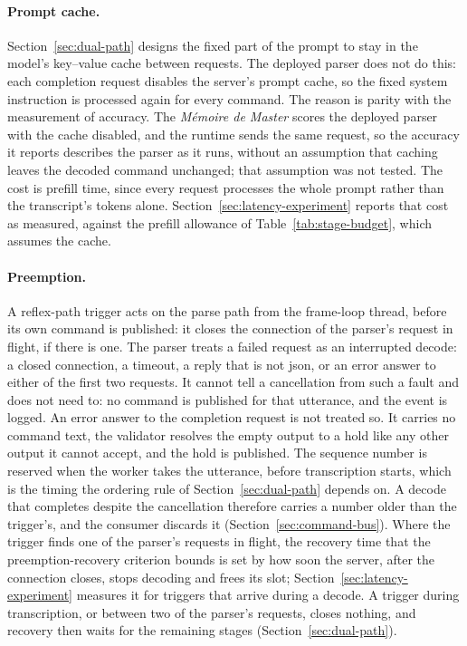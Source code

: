 \paragraph{Prompt cache.} Section~\ref{sec:dual-path} designs the fixed part of the prompt to stay
in the model's key--value cache between requests. The deployed parser does not do this: each
completion request disables the server's prompt cache, so the fixed system instruction is
processed again for every command. The reason is parity with the measurement of accuracy. The
\emph{M\'emoire de Master} scores the deployed parser with the cache disabled, and the runtime
sends the same request, so the accuracy it reports describes the parser as it runs, without an
assumption that caching leaves the decoded command unchanged; that assumption was not tested. The
cost is prefill time, since every request processes the whole prompt rather than the transcript's
tokens alone. Section~\ref{sec:latency-experiment} reports that cost as measured, against the
prefill allowance of Table~\ref{tab:stage-budget}, which assumes the cache.

\paragraph{Preemption.} A reflex-path trigger acts on the parse path from the frame-loop thread,
before its own command is published: it closes the connection of the parser's request in flight,
if there is one. The parser treats a failed request as an interrupted decode: a closed connection,
a timeout, a reply that is not \gls{json}, or an error answer to either of the first two requests.
It cannot tell a cancellation from such a fault and does not need to: no command is published for
that utterance, and the event is logged. An error answer to the completion request is not treated
so. It carries no command text, the validator resolves the empty output to a hold like any other
output it cannot accept, and the hold is published. The sequence number is
reserved when the worker takes the utterance, before transcription starts, which is the timing the
ordering rule of Section~\ref{sec:dual-path} depends on. A decode that completes despite the
cancellation therefore carries a number older than the trigger's, and the consumer discards it
(Section~\ref{sec:command-bus}). Where the trigger finds one of the parser's requests in flight, the
recovery time that the preemption-recovery criterion bounds is set by how soon the server, after
the connection closes, stops decoding and frees its slot; Section~\ref{sec:latency-experiment}
measures it for triggers that arrive during a decode. A trigger during transcription, or between
two of the parser's requests, closes nothing, and recovery then waits for the remaining stages
(Section~\ref{sec:dual-path}).

